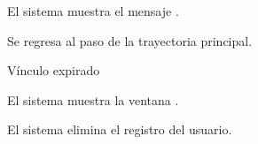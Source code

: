 {\begin{trayectoriaAlternativa}
    \item El sistema muestra el mensaje
      .

    \item Se regresa al paso  de la trayectoria
      principal.

  \end{trayectoriaAlternativa}


  \begin{trayectoriaAlternativa}
    {Vínculo expirado}

    \item El sistema muestra la ventana
      .

    \item El sistema elimina el registro del usuario.

  \end{trayectoriaAlternativa}

}
